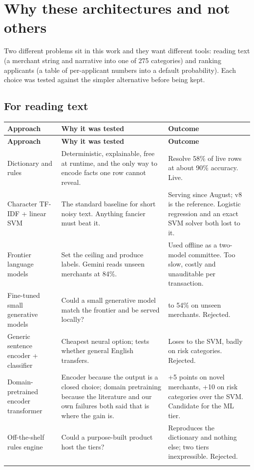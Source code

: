 \section{Why these architectures and not others}
Two different problems sit in this work and they want different tools: reading text (a merchant string and narrative into one of 275 categories) and ranking applicants (a table of per-applicant numbers into a default probability). Each choice was tested against the simpler alternative before being kept.

\subsection{For reading text}

{\small
\setlength{\TableWidth}{\dimexpr\linewidth-6\tabcolsep\relax}
\begin{longtable}{>{\raggedright\arraybackslash}p{0.29\TableWidth}>{\raggedright\arraybackslash}p{0.26\TableWidth}>{\raggedright\arraybackslash}p{0.45\TableWidth}}
\rowcolor{BlueTint}
\bfseries Approach & \bfseries Why it was tested & \bfseries Outcome \\ \midrule
\endfirsthead
\rowcolor{BlueTint}
\bfseries Approach & \bfseries Why it was tested & \bfseries Outcome \\ \midrule
\endhead
Dictionary and rules & Deterministic, explainable, free at runtime, and the only way to encode facts one row cannot reveal. & Resolve 58\% of live rows at about 90\% accuracy. Live. \\ \addlinespace[4pt]
Character TF-IDF + linear SVM & The standard baseline for short noisy text. Anything fancier must beat it. & Serving since August; v8 is the reference. Logistic regression and an exact SVM solver both lost to it. \\ \addlinespace[4pt]
Frontier language models & Set the ceiling and produce labels. Gemini reads unseen merchants at 84\%. & Used offline as a two-model committee. Too slow, costly and unauditable per transaction. \\ \addlinespace[4pt]
Fine-tuned small generative models & Could a small generative model match the frontier and be served locally? & 50 to 54\% on unseen merchants. Rejected. \\ \addlinespace[4pt]
Generic sentence encoder + classifier & Cheapest neural option; tests whether general English transfers. & Loses to the SVM, badly on risk categories. Rejected. \\ \addlinespace[4pt]
Domain-pretrained encoder transformer & Encoder because the output is a closed choice; domain pretraining because the literature and our own failures both said that is where the gain is. & +5 points on novel merchants, +10 on risk categories over the SVM. Candidate for the ML tier. \\ \addlinespace[4pt]
Off-the-shelf rules engine & Could a purpose-built product host the tiers? & Reproduces the dictionary and nothing else; two tiers inexpressible. Rejected. \\ \addlinespace[4pt]
\bottomrule
\end{longtable}}
